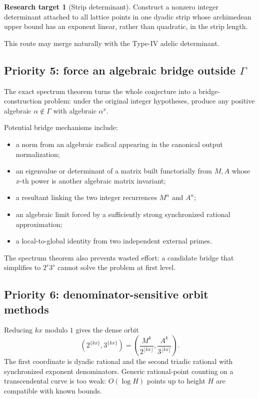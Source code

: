 \documentclass[11pt,oneside]{article}
\theoremstyle{definition}
\newtheorem{problem}[theorem]{Research target}
\theoremstyle{remark}
\begin{document}
\begin{problem}[Strip determinant]
Construct a nonzero integer determinant attached to all lattice points in one dyadic strip
whose archimedean upper bound has an exponent linear, rather than quadratic, in the strip
length.
\end{problem}

This route may merge naturally with the Type-IV adelic determinant.

\subsection{Priority 5: force an algebraic bridge outside \texorpdfstring{$\Gamma$}{Gamma}}

The exact spectrum theorem turns the whole conjecture into a bridge-construction problem:
under the original integer hypotheses, produce any positive algebraic
$\alpha\notin\Gamma$ with algebraic $\alpha^x$.

Potential bridge mechanisms include:

\begin{itemize}
\item a norm from an algebraic radical appearing in the canonical output normalization;
\item an eigenvalue or determinant of a matrix built functorially from $M,A$ whose $x$-th
      power is another algebraic matrix invariant;
\item a resultant linking the two integer recurrences $M^n$ and $A^n$;
\item an algebraic limit forced by a sufficiently strong synchronized rational approximation;
\item a local-to-global identity from two independent external primes.
\end{itemize}

The spectrum theorem also prevents wasted effort: a candidate bridge that simplifies to
$2^r3^s$ cannot solve the problem at first level.

\subsection{Priority 6: denominator-sensitive orbit methods}

Reducing $kx$ modulo $1$ gives the dense orbit
\[
 \left(2^{\{kx\}},3^{\{kx\}}\right)
 =\left(\frac{M^k}{2^{\lfloor kx\rfloor}},
        \frac{A^k}{3^{\lfloor kx\rfloor}}\right).
\]
The first coordinate is dyadic rational and the second triadic rational with synchronized
exponent denominators.  Generic rational-point counting on a transcendental curve is too
weak: $O(\log H)$ points up to height $H$ are compatible with known bounds.
\end{document}
